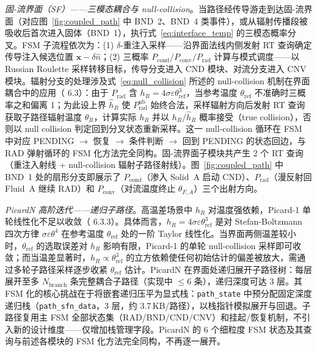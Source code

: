 \textit{固-流界面（SF）——三模态耦合与 null-collision}。当路径经传导游走到达固-流界面（对应图~\ref{fig:coupled_path} 中 BND~2、BND~4 类事件），或从辐射传播段被吸收后首次进入固体（BND~1），执行式~\eqref{eq:interface_temp} 的三模态概率分叉。FSM 子流程依次为：(1) $\delta$-重注入采样——沿界面法线内侧发射 RT 查询确定传导注入候选位置 $\mathbf{x} - \delta\hat{n}$；(2) 三概率 $P_\text{cond}/P_\text{conv}/P_\text{rad}$ 计算与模式调度——以 Russian Roulette 采样转移目标，传导分支进入 CND 模块、对流分支进入 CNV 模块。辐射分支的处理涉及式~\eqref{eq:null_collision} 所述的 null-collision 机制在界面耦合中的应用（\cite{batiCouplingConductionConvection2023} 6.3）：由于 $P_\text{rad}$ 含 $h_R = 4\sigma\varepsilon\theta_\text{ref}^3$，当参考温度 $\theta_\text{ref}$ 不准确时三概率之和偏离 1；为此设上界 $\hat{h}_R$ 使 $P_\text{rad}^\text{ub}$ 始终合法，采样辐射方向后发射 RT 查询获取子路径辐射温度 $\theta_R$，计算实际 $h_R$ 并以 $h_R/\hat{h}_R$ 概率接受（true collision），否则以 null collision 判定回到分叉状态重新采样。这一 null-collision 循环在 FSM 中对应 PENDING $\to$ 恢复 $\to$ 条件判断 $\to$ 回到 PENDING 的状态回边，与 RAD 弹射循环的 FSM 化方法完全同构。固-流界面子模块共产生 2 个 RT 查询（重注入射线 $+$ null-collision 辐射子路径射线）。图~\ref{fig:coupled_path} 中 BND~1 处的扇形分支即展示了 $P_\text{cond}$（渗入 Solid~A 启动 CND）、$P_\text{rad}$（漫反射回 Fluid~A 继续 RAD）和 $P_\text{conv}$（对流温度终止 $\theta_{F,A}$）三个出射方向。

\textit{PicardN 高阶迭代——递归子路径}。高温差场景中 $h_R$ 对温度强依赖，Picard-1 单轮线性化不足以收敛（\cite{batiCouplingConductionConvection2023} 6.3.3）。具体而言，$h_R = 4\sigma\varepsilon\theta_\text{ref}^3$ 是对 Stefan-Boltzmann 四次方律 $\sigma\varepsilon\theta^4$ 在参考温度 $\theta_\text{ref}$ 处的一阶 Taylor 线性化\cite{batiCouplingConductionConvection2023}。当界面两侧温差较小时，$\theta_\text{ref}$ 的选取误差对 $h_R$ 影响有限，Picard-1 的单轮 null-collision 采样即可收敛；而当温差显著时，$h_R \propto \theta_\text{ref}^3$ 的立方依赖使任何初始估计的偏差被放大，需通过多轮子路径采样逐步收紧 $\theta_\text{ref}$ 估计。PicardN 在界面处递归展开子路径树：每层展开至多 $N_\text{branch}$ 条完整耦合子路径（实现中 $\leq 6$ 条），递归深度可达 3 层。其 FSM 化的核心挑战在于将嵌套递归压平为显式栈：\texttt{path\_state} 中预分配固定深度递归栈（\texttt{path\_sfn\_data}，3 层，约 3.7\,KB/路径），以栈指针模拟展开与回退。子路径复用主 FSM 全部状态集（RAD/BND/CND/CNV）和挂起/恢复机制，不引入新的设计维度——仅增加栈管理字段。PicardN 的 6 个细粒度 FSM 状态及其查询与前述各模块的 FSM 化方法完全同构，不再逐一展开。

